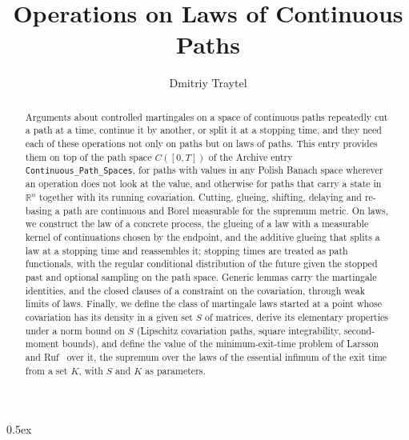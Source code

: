 \documentclass[11pt,a4paper]{article}
\begin{document}
\title{Operations on Laws of Continuous Paths}
\author{Dmitriy Traytel}
\maketitle

\begin{abstract}
  Arguments about controlled martingales on a space of continuous paths
  repeatedly cut a path at a time, continue it by another, or split it at a
  stopping time, and they need each of these operations not only on paths
  but on laws of paths.  This entry provides them on top of the path space
  $C([0,T])$ of the Archive entry \texttt{Continuous\_Path\_Spaces}, for
  paths with values in any Polish Banach space wherever an operation does
  not look at the value, and otherwise for paths that carry a state in
  $\mathbb{R}^n$ together with its running covariation.  Cutting, glueing,
  shifting, delaying and re-basing a path are continuous and Borel
  measurable for the supremum metric.  On laws, we construct the law of a
  concrete process, the glueing of a law with a measurable kernel of
  continuations chosen by the endpoint, and the additive glueing that splits
  a law at a stopping time and reassembles it; stopping times are treated as
  path functionals, with the regular conditional distribution of the future
  given the stopped past and optional sampling on the path space.  Generic
  lemmas carry the martingale identities, and the closed clauses of a
  constraint on the covariation, through weak limits of laws.  Finally, we
  define the class of martingale laws started at a point whose covariation
  has its density in a given set $S$ of matrices, derive its elementary
  properties under a norm bound on $S$ (Lipschitz covariation paths,
  square integrability, second-moment bounds), and define the value
  of the minimum-exit-time problem of Larsson and Ruf~\cite{LarssonRuf}
  over it, the supremum over the laws of the essential infimum of the exit
  time from a set $K$, with $S$ and $K$ as parameters.
\end{abstract}

\tableofcontents

\parindent 0pt\parskip 0.5ex





\end{document}
